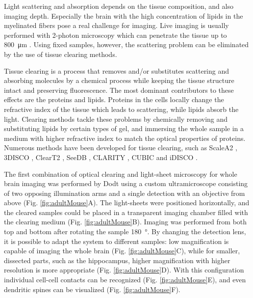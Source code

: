     Light scattering and absorption depends on the tissue composition, and also imaging depth. Especially the brain with the high concentration of lipids in the myelinated fibers pose a real challenge for imaging. Live imaging is usually performed with 2-photon microscopy which can penetrate the tissue up to \SI{800}{\micro m} \cite{katona_fast_2012}. Using fixed samples, however, the scattering problem can be eliminated by the use of tissue clearing methods.

    Tissue clearing is a process that removes and/or substitutes scattering and absorbing molecules by a chemical process while keeping the tissue structure intact and preserving fluorescence. The most dominant contributors to these effects are the proteins and lipids. Proteins in the cells locally change the refractive index of the tissue which leads to scattering, while lipids absorb the light. Clearing methods tackle these problems by chemically removing and substituting lipids by certain types of gel, and immersing the whole sample in a medium with higher refractive index to match the optical properties of proteins. Numerous methods have been developed for tissue clearing, such as ScaleA2 \cite{hama_scale:_2011}, 3DISCO \cite{erturk_three-dimensional_2012,erturk_three-dimensional_2012-1}, ClearT2 \cite{kuwajima_cleart:_2013}, SeeDB \cite{ke_seedb:_2013}, CLARITY \cite{chung_clarity_2013,tomer_advanced_2014}, CUBIC \cite{susaki_whole-brain_2014} and iDISCO \cite{renier_idisco:_2014}.

    The first combination of optical clearing and light-sheet microscopy for whole brain imaging was performed by Dodt \etal using a custom ultramicroscope consisting of two opposing illumination arms and a single detection with an objective from above (Fig. \ref{fig:adultMouse}A). The light-sheets were positioned horizontally, and the cleared samples could be placed in a transparent imaging chamber filled with the clearing medium (Fig. \ref{fig:adultMouse}B). Imaging was performed from both top and bottom after rotating the sample \SI{180}{\degree}. By changing the detection lens, it is possible to adapt the system to different samples: low magnification is capable of imaging the whole brain (Fig. \ref{fig:adultMouse}C), while for smaller, dissected parts, such as the hippocampus, higher magnification with higher resolution is more appropriate (Fig. \ref{fig:adultMouse}D). With this configuration individual cell-cell contacts can be recognized (Fig. \ref{fig:adultMouse}E), and even dendritic spines can be visualized (Fig. \ref{fig:adultMouse}F).

